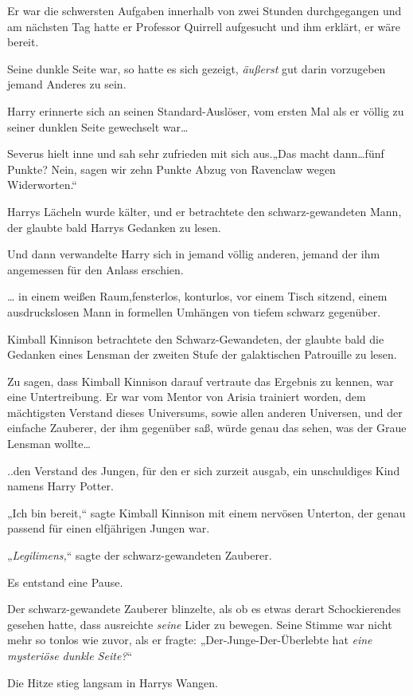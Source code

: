 {Er war die schwersten Aufgaben innerhalb von zwei Stunden durchgegangen und am nächsten Tag hatte er Professor Quirrell aufgesucht und ihm erklärt, er wäre bereit.

Seine dunkle Seite war, so hatte es sich gezeigt, \emph{äußerst} gut darin vorzugeben jemand Anderes zu sein.

Harry erinnerte sich an seinen Standard-Auslöser, vom ersten Mal als er völlig zu seiner dunklen Seite gewechselt war…

Severus hielt inne und sah sehr zufrieden mit sich aus.„Das macht dann…fünf Punkte? Nein, sagen wir zehn Punkte Abzug von Ravenclaw wegen Widerworten.“

Harrys Lächeln wurde kälter, und er betrachtete den schwarz-gewandeten Mann, der glaubte bald Harrys Gedanken zu lesen.

Und dann verwandelte Harry sich in jemand völlig anderen, jemand der ihm angemessen für den Anlass erschien.

… in einem weißen Raum,fensterlos, konturlos, vor einem Tisch sitzend, einem ausdruckslosen Mann in formellen Umhängen von tiefem schwarz gegenüber.

Kimball Kinnison betrachtete den Schwarz-Gewandeten, der glaubte bald die Gedanken eines Lensman der zweiten Stufe der galaktischen Patrouille zu lesen.

Zu sagen, dass Kimball Kinnison darauf vertraute das Ergebnis zu kennen, war eine Untertreibung. Er war vom Mentor von Arisia trainiert worden, dem mächtigsten Verstand dieses Universums, sowie allen anderen Universen, und der einfache Zauberer, der ihm gegenüber saß, würde genau das sehen, was der Graue Lensman wollte…

..den Verstand des Jungen, für den er sich zurzeit ausgab, ein unschuldiges Kind namens Harry Potter.

„Ich bin bereit,“ sagte Kimball Kinnison mit einem nervösen Unterton, der genau passend für einen elfjährigen Jungen war.

„\emph{Legilimens,}“ sagte der schwarz-gewandeten Zauberer.

Es entstand eine Pause.

Der schwarz-gewandete Zauberer blinzelte, als ob es etwas derart Schockierendes gesehen hatte, dass ausreichte \emph{seine} Lider zu bewegen. Seine Stimme war nicht mehr so tonlos wie zuvor, als er fragte: „Der-Junge-Der-Überlebte hat \emph{eine mysteriöse dunkle Seite?}“

Die Hitze stieg langsam in Harrys Wangen.

}
